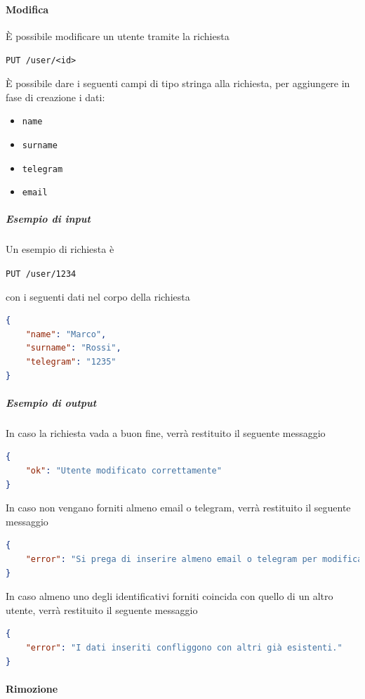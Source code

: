 \paragraph{Modifica}

È possibile modificare un utente tramite la richiesta
\begin{center}
    \texttt{PUT /user/<id>}
\end{center}

È possibile dare i seguenti campi di tipo stringa alla richiesta, per aggiungere in fase di creazione i dati:
\begin{itemize}[noitemsep]
    \item \texttt{name}
    \item \texttt{surname}
    \item \texttt{telegram}
    \item \texttt{email}
\end{itemize}

    \subparagraph{Esempio di input}
    Un esempio di richiesta è
    \begin{center}
	    \texttt{PUT /user/1234}
    \end{center}
    con i seguenti dati nel corpo della richiesta
	\begin{lstlisting}[language = json]
{
    "name": "Marco",
    "surname": "Rossi",
    "telegram": "1235"
}
    \end{lstlisting}

    \subparagraph{Esempio di output}
    In caso la richiesta vada a buon fine, verrà restituito il seguente messaggio
	\begin{lstlisting}[language = json]
{
    "ok": "Utente modificato correttamente"
}
	\end{lstlisting}

	In caso non vengano forniti almeno email o telegram, verrà restituito il seguente messaggio
	\begin{lstlisting}[language = json]
{
    "error": "Si prega di inserire almeno email o telegram per modificare l'utente."
}
	\end{lstlisting}

	In caso almeno uno degli identificativi forniti coincida con quello di un altro utente, verrà restituito il seguente messaggio
	\begin{lstlisting}[language = json]
{
    "error": "I dati inseriti confliggono con altri già esistenti."
}
	\end{lstlisting}

\paragraph{Rimozione}

